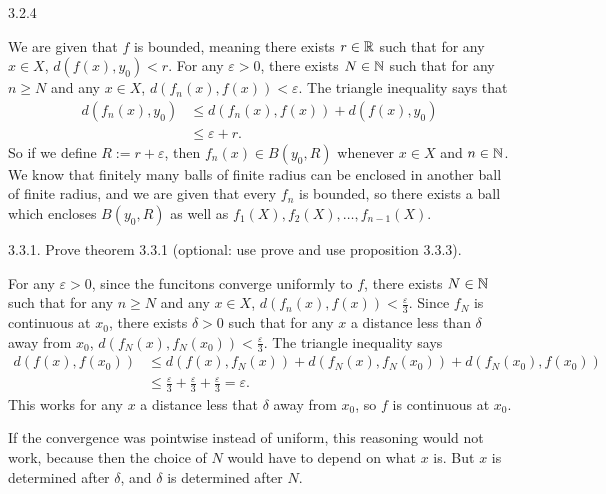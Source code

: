 \documentclass{article}
\begin{document}
\bigskip
\begin{prob}
    3.2.4
\end{prob}
We are given that $f$ is bounded, meaning there exists $r \in \mathbb{R}$ such that for any $x \in X$, $d(f(x), y_0) < r$. For any $\varepsilon > 0$, there exists $N \in \mathbb{N}$ such that for any $n \geq N$ and any $x \in X$, $d(f_n(x), f(x)) < \varepsilon$. The triangle inequality says that
\begin{align*}
    d(f_n(x), y_0) &\leq d(f_n(x), f(x)) + d(f(x), y_0) \\
                   &\leq \varepsilon + r.
\end{align*}
So if we define $R := r + \varepsilon$, then $f_n(x) \in B(y_0, R)$ whenever $x \in X$ and $n \in \mathbb{N}$. We know that finitely many balls of finite radius can be enclosed in another ball of finite radius, and we are given that every $f_n$ is bounded, so there exists a ball which encloses $B(y_0, R)$ as well as $f_1(X), f_2(X), \dots, f_{n-1}(X)$.

\bigskip
\begin{prob}
    3.3.1. Prove theorem 3.3.1 (optional: use prove and use proposition 3.3.3).
\end{prob}
For any $\varepsilon > 0$, since the funcitons converge uniformly to $f$, there exists $N \in \mathbb{N}$ such that for any $n \geq N$ and any $x \in X$, $d(f_n(x), f(x)) < \frac{\varepsilon}{3}$. Since $f_N$ is continuous at $x_0$, there exists $\delta > 0$ such that for any $x$ a distance less than $\delta$ away from $x_0$, $d(f_N(x), f_N(x_0)) < \frac{\varepsilon}{3}$. The triangle inequality says
\begin{align*}
    d(f(x), f(x_0)) &\leq d(f(x), f_N(x)) + d(f_N(x), f_N(x_0)) + d(f_N(x_0), f(x_0)) \\
                    &\leq \frac{\varepsilon}{3} + \frac{\varepsilon}{3} + \frac{\varepsilon}{3} = \varepsilon.
\end{align*}
This works for any $x$ a distance less that $\delta$ away from $x_0$, so $f$ is continuous at $x_0$.
\par
If the convergence was pointwise instead of uniform, this reasoning would not work, because then the choice of $N$ would have to depend on what $x$ is. But $x$ is determined after $\delta$, and $\delta$ is determined after $N$.


\end{document}
